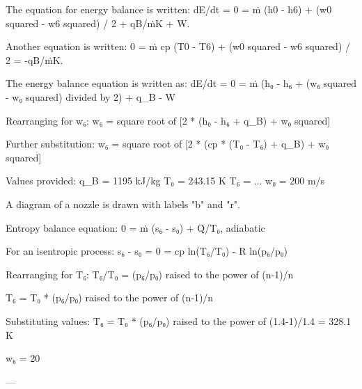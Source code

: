 The equation for energy balance is written:  
dE/dt = 0 = ṁ (h0 - h6) + (w0 squared - w6 squared) / 2 + qB/ṁK + W.  

Another equation is written:  
0 = ṁ cp (T0 - T6) + (w0 squared - w6 squared) / 2 = -qB/ṁK.

The energy balance equation is written as:  
dE/dt = 0 = ṁ (h₀ - h₆ + (w₆ squared - w₀ squared) divided by 2) + q_B - W  

Rearranging for w₆:  
w₆ = square root of [2 * (h₀ - h₆ + q_B) + w₀ squared]  

Further substitution:  
w₆ = square root of [2 * (cp * (T₀ - T₆) + q_B) + w₀ squared]  

Values provided:  
q_B = 1195 kJ/kg  
T₀ = 243.15 K  
T₆ = ...  
w₀ = 200 m/s  

A diagram of a nozzle is drawn with labels "b" and "r".  

Entropy balance equation:  
0 = ṁ (s₆ - s₀) + Q̇/T₀, adiabatic  

For an isentropic process:  
s₆ - s₀ = 0 = cp ln(T₆/T₀) - R ln(p₆/p₀)  

Rearranging for T₆:  
T₆/T₀ = (p₆/p₀) raised to the power of (n-1)/n  

T₆ = T₀ * (p₆/p₀) raised to the power of (n-1)/n  

Substituting values:  
T₆ = T₀ * (p₆/p₀) raised to the power of (1.4-1)/1.4 = 328.1 K  

w₆ = 20  

---